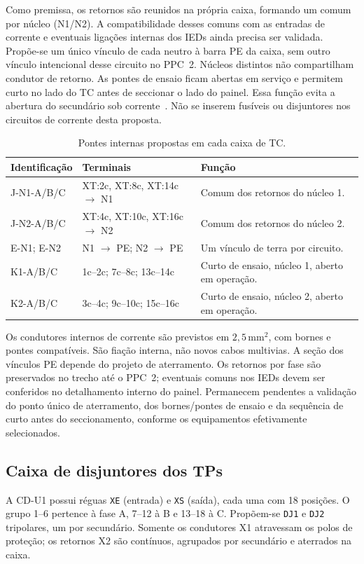 \documentclass[11pt,a4paper]{article}
\newcommand{\tagg}[1]{\texttt{#1}}
\begin{document}
Como premissa, os retornos são reunidos na própria caixa, formando um comum
por núcleo (N1/N2). A compatibilidade desses comuns com as entradas de corrente
e eventuais ligações internas dos IEDs ainda precisa ser validada.
Propõe-se um único vínculo de cada neutro à barra PE da caixa, sem outro vínculo
intencional desse circuito no PPC~2. Núcleos distintos não compartilham condutor
de retorno. As pontes de ensaio ficam abertas em serviço e permitem curto no lado
do TC antes de seccionar o lado do painel. Essa função evita a abertura do
secundário sob corrente~\cite{ctseguro}. Não se inserem fusíveis ou disjuntores
nos circuitos de corrente desta proposta.

\begin{table}[htbp]\centering\small
\caption{Pontes internas propostas em cada caixa de TC.}
\begin{tabularx}{\linewidth}{@{}L{3.5cm}L{4.0cm}Y@{}}\toprule
Identificação & Terminais & Função \\\midrule
J-N1-A/B/C & XT:2c, XT:8c, XT:14c $\to$ N1 & Comum dos retornos do núcleo 1.\\
J-N2-A/B/C & XT:4c, XT:10c, XT:16c $\to$ N2 & Comum dos retornos do núcleo 2.\\
E-N1; E-N2 & N1 $\to$ PE; N2 $\to$ PE & Um vínculo de terra por circuito.\\
K1-A/B/C & 1c--2c; 7c--8c; 13c--14c & Curto de ensaio, núcleo 1, aberto em operação.\\
K2-A/B/C & 3c--4c; 9c--10c; 15c--16c & Curto de ensaio, núcleo 2, aberto em operação.\\\bottomrule
\end{tabularx}\end{table}
Os condutores internos de corrente são previstos em $2{,}5\,\mathrm{mm^2}$,
com bornes e pontes compatíveis. São fiação interna, não novos cabos multivias.
A seção dos vínculos PE depende do projeto de aterramento. Os retornos por fase
são preservados no trecho até o PPC~2; eventuais comuns nos IEDs devem ser
conferidos no detalhamento interno do painel. Permanecem pendentes a validação
do ponto único de aterramento, dos bornes/pontes de ensaio e da sequência de
curto antes do seccionamento, conforme os equipamentos efetivamente selecionados.

\subsection{Caixa de disjuntores dos TPs}
A CD-U1 possui réguas \tagg{XE} (entrada) e \tagg{XS} (saída), cada uma com
18 posições. O grupo 1--6 pertence à fase A, 7--12 à B e 13--18 à C.
Propõem-se \tagg{DJ1} e \tagg{DJ2} tripolares, um por secundário.
Somente os condutores X1 atravessam os polos de proteção; os retornos X2 são
contínuos, agrupados por secundário e aterrados na caixa.
\end{document}
